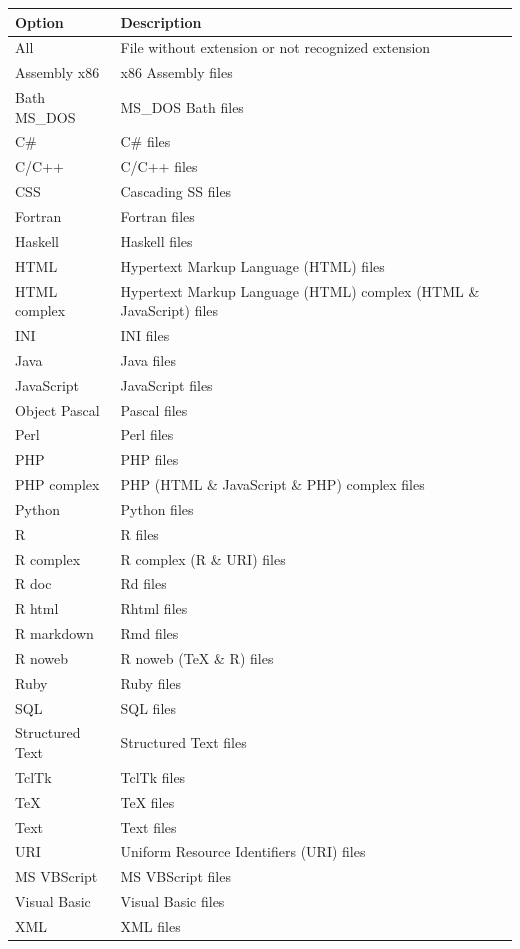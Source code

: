 \begin{scriptsize}\begin{tabularx}{\textwidth}{>{\hsize=0.2\hsize}X>{\hsize=0.8\hsize}X}\\
    \hline
    \textbf{Option} & \textbf{Description} \\
    \hline
    All & File without extension or not recognized extension \\
    Assembly x86 & x86 Assembly files \\
    Bath MS\_DOS & MS\_DOS Bath files \\
    C\# & C\# files \\
    C/C++ & C/C++ files \\
    CSS & Cascading SS files \\
    Fortran & Fortran files \\
    Haskell & Haskell files \\
    HTML & Hypertext Markup Language (HTML) files \\
    HTML complex & Hypertext Markup Language (HTML) complex (HTML \& JavaScript) files \\
    INI & INI files \\
    Java & Java files \\
    JavaScript & JavaScript files \\
    Object Pascal & Pascal files \\
    Perl & Perl files \\
    PHP & PHP files \\
    PHP complex & PHP (HTML \& JavaScript \& PHP) complex files \\
    Python & Python files \\
    R & R files \\
    R complex & R complex (R \& URI) files \\
    R doc & Rd files \\
    R html & Rhtml files \\
    R markdown & Rmd files \\
    R noweb & R noweb (TeX \& R) files \\
    Ruby & Ruby files \\
    SQL & SQL files \\
    Structured Text & Structured Text files \\
    TclTk & TclTk files \\
    TeX & TeX files \\
    Text & Text files \\
    URI & Uniform Resource Identifiers (URI) files \\
    MS VBScript & MS VBScript files \\
    Visual Basic & Visual Basic files \\
    XML & XML files \\
    \hline
  \end{tabularx}\end{scriptsize}

